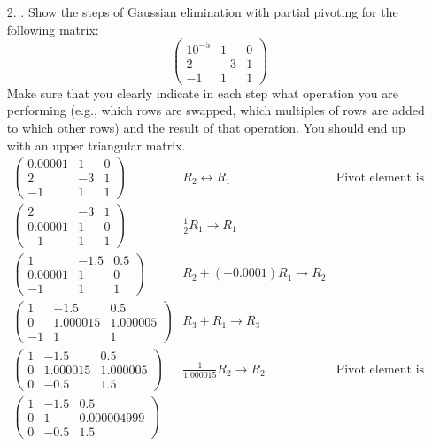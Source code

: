 \documentclass{article}
\begin{document}
\begin{itemize}
    \newpage
    \item[2.] . Show the steps of Gaussian elimination with partial pivoting for the following matrix:
    \[\begin{pmatrix} 10^{-5} & 1 & 0 \\ 2 & -3 & 1 \\ -1 & 1 & 1 \end{pmatrix}\]
    Make sure that you clearly indicate in each step what operation you are performing (e.g., which rows are swapped, which multiples of rows are added to which other rows) and the result of that operation. You should end up with an upper triangular matrix.
    \begin{align*}
        \begin{pmatrix} 0.00001 & 1 & 0 \\ 2 & -3 & 1 \\ -1 & 1 & 1 \end{pmatrix}
        & R_2\leftrightarrow R_1 & \text{Pivot element is 2}\\
        \begin{pmatrix} 2 & -3 & 1 \\ 0.00001 & 1 & 0 \\ -1 & 1 & 1 \end{pmatrix}
        & \frac{1}{2}R_1\rightarrow R_1 &\\
        \begin{pmatrix} 1 & -1.5 & 0.5 \\ 0.00001 & 1 & 0 \\ -1 & 1 & 1 \end{pmatrix}
        & R_2 + (-0.0001)R_1\rightarrow R_2 &\\
        \begin{pmatrix} 1 & -1.5 & 0.5 \\ 0 & 1.000015 & 1.000005 \\ -1 & 1 & 1 \end{pmatrix}
        & R_3 + R_1\rightarrow R_3 &\\
        \begin{pmatrix} 1 & -1.5 & 0.5 \\ 0 & 1.000015 & 1.000005 \\ 0 & -0.5 & 1.5 \end{pmatrix}
        & \frac{1}{1.000015}R_2\rightarrow R_2 & \text{Pivot element is 1.000015} \\
        \begin{pmatrix} 1 & -1.5 & 0.5 \\ 0 & 1 & 0.000004999 \\ 0 & -0.5 & 1.5 \end{pmatrix}

\end{align*}
\end{itemize}
\end{document}
